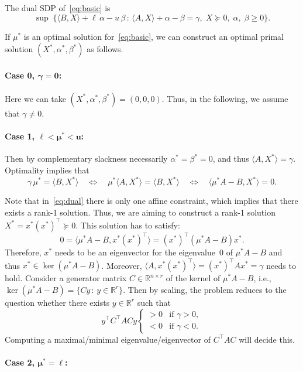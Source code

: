 \documentclass[10pt, a4paper]{article}
\newcommand{\suchthat}{\,:\,}
\newcommand{\skal}[2]{\langle{#1},{#2}\rangle}
\newcommand{\T}{^{\top}}
\newcommand{\R}{\mathds{R}}
\begin{document}
The dual SDP of~\eqref{eq:basic} is
\begin{equation}\label{eq:dual}
  \sup\; \{\skal{B}{X} + \ell\, \alpha - u\, \beta \suchthat \skal{A}{X} +
  \alpha - \beta = \gamma,\; X \succeq 0,\; \alpha,\; \beta \geq 0\}.
\end{equation}

If $\mu^*$ is an optimal solution for~\eqref{eq:basic}, we can construct an
optimal primal solution $(X^*, \alpha^*, \beta^*)$ as follows.

\paragraph{Case 0, $\boldsymbol{\gamma = 0}$:}

Here we can take $(X^*, \alpha^*, \beta^*) = (0,0,0)$. Thus, in the
following, we assume that $\gamma \neq 0$.

\paragraph{Case 1, $\boldsymbol{\ell < \mu^* < u}$:}

Then by complementary slackness necessarily $\alpha^* = \beta^* = 0$, and
thus $\skal{A}{X^*} = \gamma$. Optimality implies that
\[
\gamma\, \mu^* = \skal{B}{X^*}
\quad\Leftrightarrow\quad
\mu^* \skal{A}{X^*} = \skal{B}{X^*}
\quad\Leftrightarrow\quad
\skal{\mu^* A - B}{X^*} = 0.
\]

Note that in~\eqref{eq:dual} there is only one affine constraint, which
implies that there exists a rank-1 solution. Thus, we are aiming to
construct a rank-1 solution $X^* = x^* (x^*)\T \succeq 0$.  This solution
has to satisfy:
\[
0 = \skal{\mu^* A - B}{x^* (x^*)\T} = (x^*)\T (\mu^* A - B) x^*.
\]
Therefore, $x^*$ needs to be an eigenvector for the eigenvalue~$0$ of
$\mu^* A - B$ and thus $x^* \in \ker(\mu^* A - B)$. Moreover,
$\skal{A}{x^*(x^*)\T} = (x^*)\T A x^* = \gamma$ needs to hold.  Consider a
generator matrix $C \in \R^{n \times r}$ of the kernel of $\mu^* A - B$,
i.e., $\ker(\mu^* A - B) = \{C y \suchthat y \in \R^r\}$.  Then by scaling,
the problem reduces to the question whether there exists $y \in \R^r$ such
that
\[
y\T C\T A C y
\begin{cases}
  > 0 & \text{if } \gamma > 0,\\
  < 0 & \text{if } \gamma < 0.
\end{cases}
\]
Computing a maximal/minimal eigenvalue/eigenvector of $C\T A C$ will decide
this.

\paragraph{Case 2, $\boldsymbol{\mu^* = \ell}$:}
\end{document}
